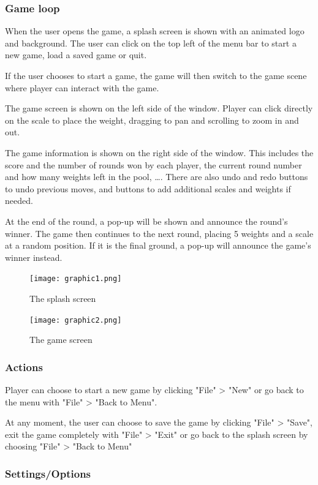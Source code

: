 \documentclass[12pt]{article}
\begin{document}
\subsubsection{Game loop}

When the user opens the game, a splash screen is shown with an animated logo and
background. The user can click on the top left of the menu bar to start a new
game, load a saved game or quit.

If the user chooses to start a game, the game will then switch to the game scene
where player can interact with the game. 

The game screen is shown on the left side of the window. Player can click
directly on the scale to place the weight, dragging to pan and scrolling to zoom
in and out.

The game information is shown on the right side of the window. This includes the
score and the number of rounds won by each player, the current round number and
how many weights left in the pool, \dots. There are also undo and redo buttons
to undo previous moves, and buttons to add additional scales and weights if
needed.

At the end of the round, a pop-up will be shown and announce the round's winner.
The game then continues to the next round, placing 5 weights and a scale at a
random position. If it is the final ground, a pop-up will announce the game's
winner instead.

\begin{figure}
  \centering
  \caption{The splash screen}
  \texttt{[image: graphic1.png]}
  \label{fig:gra1}
\end{figure}
\begin{figure}
  \centering
  \caption{The game screen}
  \texttt{[image: graphic2.png]}
  \label{fig:gra2}
\end{figure}
\subsubsection{Actions}

Player can choose to start a new game by clicking "File" > "New" or go back to
the menu with "File" > "Back to Menu".

At any moment, the user can choose to save the game by clicking "File" > "Save",
exit the game completely with "File" > "Exit" or go back to the splash screen by
choosing "File" > "Back to Menu"

\subsubsection{Settings/Options}
\end{document}
